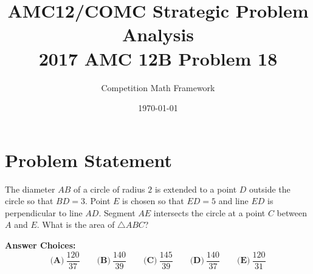 \documentclass[]{article}
\begin{document}
\title{\textbf{AMC12/COMC Strategic Problem Analysis\\2017 AMC 12B Problem 18}}
\author{Competition Math Framework}
\date{\today}
\maketitle

\section*{Problem Statement}
The diameter $AB$ of a circle of radius $2$ is extended to a point $D$ outside the circle so that $BD=3$. Point $E$ is chosen so that $ED=5$ and line $ED$ is perpendicular to line $AD$. Segment $AE$ intersects the circle at a point $C$ between $A$ and $E$. What is the area of $\triangle ABC$?

\textbf{Answer Choices:}
\[\textbf{(A)}\ \frac{120}{37}\qquad\textbf{(B)}\ \frac{140}{39}\qquad\textbf{(C)}\ \frac{145}{39}\qquad\textbf{(D)}\ \frac{140}{37}\qquad\textbf{(E)}\ \frac{120}{31}\]
\end{document}
